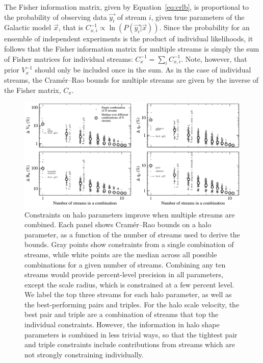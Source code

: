 \documentclass[modern]{aastex62}
\begin{document}
The Fisher information matrix, given by Equation~\ref{eq:crlb}, is proportional to the probability of observing data $\vec{y_i}$ of stream $i$, given true parameters of the Galactic model $\vec{x}$, that is $C_{x,i}^{-1}\propto \ln(P(\vec{y_i}|\vec{x}))$.
Since the probability for an ensemble of independent experiments is the product of individual likelihoods, it follows that the Fisher information matrix for multiple streams is simply the sum of Fisher matrices for individual streams: $C_x^{-1} = \sum_{i} C_{x,i}^{-1}$.
Note, however, that prior $V_x^{-1}$ should only be included once in the sum.
As in the case of individual streams, the Cram\' er--Rao bounds for multiple streams are given by the inverse of the Fisher matrix, $C_x$.

\begin{figure}
\begin{center}
\includegraphics[width=\textwidth]{nstream_improvement.pdf}
\caption{Constraints on halo parameters improve when multiple streams are combined.
Each panel shows Cram\'er--Rao bounds on a halo parameter, as a function of the number of streams used to derive the bounds.
Gray points show constraints from a single combination of streams, while white points are the median across all possible combinations for a given number of streams.
Combining any ten streams would provide percent-level precision in all parameters, except the scale radius, which is constrained at a few percent level.
We label the top three streams for each halo parameter, as well as the best-performing pairs and triples.
For the halo scale velocity, the best pair and triple are a combination of streams that top the individual constraints.
However, the information in halo shape parameters is combined in less trivial ways, so that the tightest pair and triple constraints include contributions from streams which are not strongly constraining individually.
}
\label{fig:nstream_summary}
\end{center}
\end{figure}
\end{document}
